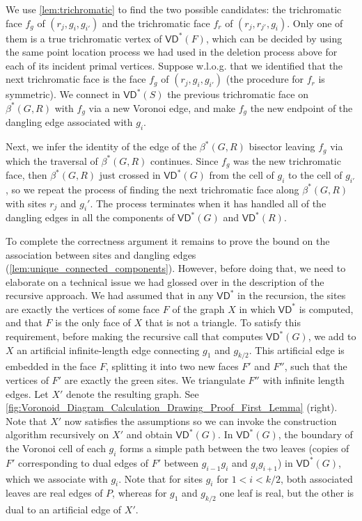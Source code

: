 \documentclass{article}
\newcommand{\VD}{\textsf{VD}}
\newcommand{\X}{X}
\begin{document}
We use \cref{lem:trichromatic} to  find the two possible candidates: the trichromatic face $f_g$ of $(r_j, g_i, g_{i'})$ and the trichromatic face $f_r$ of $(r_j, r_{j'}, g_i)$. Only one of them is a true trichromatic vertex of $\VD^*(F)$, which can be decided by using the same point location process we had used in the deletion process above for each of its incident primal vertices.
Suppose w.l.o.g. that we identified that the next trichromatic face is the face $f_g$ of $(r_j, g_i, g_{i'})$ (the procedure for $f_r$ is symmetric).
We connect in $\VD^*(S)$ the previous trichromatic face on $\beta^*(G,R)$ with $f_g$ via a new Voronoi edge, and make $f_g$ the new endpoint of the dangling edge associated with $g_i$.

Next, we infer the identity of the edge of the $\beta^*(G,R)$ bisector leaving $f_g$ via which the traversal of $\beta^*(G,R)$ continues. Since  $f_g$ was the new trichromatic face, then $\beta^*(G,R)$ just crossed in $\VD^*(G)$ from the cell of $g_i$ to the cell of $g_{i'}$, so we repeat the process of finding the next trichromatic face along $\beta^*(G,R)$ with sites $r_j$ and $g_i'$.  The process terminates when it has handled all of the dangling edges in all the components of $\VD^*(G)$ and $\VD^*(R)$.


To complete the correctness argument it remains to prove the bound on the association between sites and dangling edges (\cref{lem:unique_connected_components}). However, before doing that, we need to elaborate on a technical issue we had glossed over in the description of the recursive approach.
We had assumed that in any $\VD^*$ in the recursion, the sites are exactly the vertices of some face $F$ of the graph $\X$  in which $\VD^*$ is computed, and that $F$ is the only face of $\X$ that is not a triangle.
To satisfy this requirement, before making the recursive call that computes $\VD^*(G)$, we add to $\X$ an artificial infinite-length edge connecting $g_1$ and $g_{k/2}$. This artificial edge is embedded in the face $F$, splitting it into two new faces $F'$ and $F''$, such that the vertices of $F'$ are exactly the green sites.
We triangulate $F''$ with infinite length edges.
Let $\X'$ denote the resulting graph.
See \cref{fig:Voronoid_Diagram_Calculation_Drawing_Proof_First_Lemma} (right).
Note that $\X'$ now satisfies the assumptions so we can invoke the construction algorithm recursively on $\X'$ and obtain $\VD^*(G)$.
In $\VD^*(G)$, the boundary of the Voronoi cell of each $g_i$ forms a simple path between the two leaves (copies of $F'$ corresponding to dual edges of $F'$ between $g_{i-1}g_i$ and $g_i g_{i+1}$) in $\VD^*(G)$, which we associate with $g_i$.
Note that for sites $g_i$ for $1<i<k/2$, both associated leaves are real edges of $P$, whereas for $g_1$ and $g_{k/2}$ one leaf is real, but the other is dual to an artificial edge of $\X'$.
\end{document}
